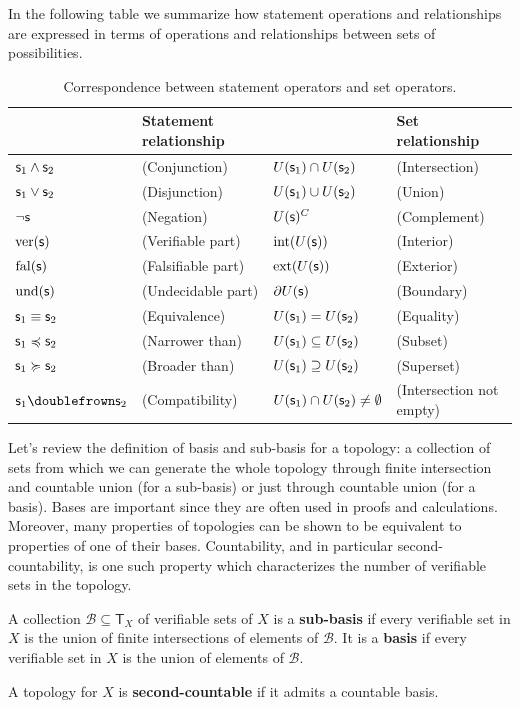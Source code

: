 	In the following table we summarize how statement operations and relationships are expressed in terms of operations and relationships between sets of possibilities.
	
	\begin{table}[h]
		\centering
		\begin{tabular}{p{} p{} p{} p{}}
			& Statement relationship & & Set relationship  \\ 
			\hline 
			$\mathsf{s}_1 \wedge \mathsf{s}_2$ & (Conjunction) & $U(\mathsf{s}_1) \cap U(\mathsf{s}_2)$ & (Intersection) \\ 
			$\mathsf{s}_1 \vee \mathsf{s}_2$ & (Disjunction) & $U(\mathsf{s}_1) \cup U(\mathsf{s}_2)$ & (Union) \\ 
			$\neg \mathsf{s}$ & (Negation) & $U(\mathsf{s})^C$ & (Complement) \\ 
			$\operatorname{ver}(\mathsf{s})$ & (Verifiable part) & $\operatorname{int}(U(\mathsf{s}))$ & (Interior) \\ 
			$\operatorname{fal}(\mathsf{s})$ & (Falsifiable part) & $\operatorname{ext}(U(\mathsf{s}))$ & (Exterior) \\ 
			$\operatorname{und}(\mathsf{s})$ & (Undecidable part) & $\partial U(\mathsf{s})$ & (Boundary) \\ 
			$\mathsf{s}_1 \equiv \mathsf{s}_2$ & (Equivalence) & $U(\mathsf{s}_1) = U(\mathsf{s}_2)$ & (Equality) \\ 
			$\mathsf{s}_1 \preccurlyeq \mathsf{s}_2$ & (Narrower than) & $U(\mathsf{s}_1) \subseteq U(\mathsf{s}_2)$ & (Subset) \\ 
			$\mathsf{s}_1 \succcurlyeq \mathsf{s}_2$ & (Broader than) & $U(\mathsf{s}_1) \supseteq U(\mathsf{s}_2)$ & (Superset) \\ 
			$\stmt_1 \comp \stmt_2$ & (Compatibility) & $U(\mathsf{s}_1) \cap U(\mathsf{s}_2) \neq \emptyset$ & (Intersection not empty)
		\end{tabular} 
		\caption{Correspondence between statement operators and set operators.}
	\end{table}
	
	Let's review the definition of basis and sub-basis for a topology: a collection of sets from which we can generate the whole topology through finite intersection and countable union (for a sub-basis) or just through countable union (for a basis). Bases are important since they are often used in proofs and calculations. Moreover, many properties of topologies can be shown to be equivalent to properties of one of their bases. Countability, and in particular second-countability, is one such property which characterizes the number of verifiable sets in the topology.
	
	\begin{mathSection}
		\begin{defn}
			A collection $\mathcal{B} \subseteq \mathsf{T}_X$ of verifiable sets of $X$ is a \textbf{sub-basis} if every verifiable set in $X$ is the union of finite intersections of elements of $\mathcal{B}$. It is a \textbf{basis} if every verifiable set in $X$ is the union of elements of $\mathcal{B}$.
		\end{defn}
		\begin{defn}
			A topology for $X$ is \textbf{second-countable} if it admits a countable basis.
		\end{defn}
	\end{mathSection}
	
